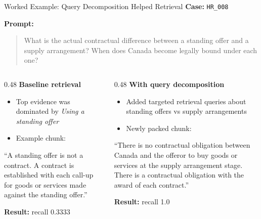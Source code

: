 \documentclass[aspectratio=169]{beamer}
\begin{document}
\appendix

\begin{frame}{Worked Example: Query Decomposition Helped Retrieval}
  \small
  \textbf{Case:} \texttt{HR\_008}

  \vspace{0.4em}
  \textbf{Prompt:}
  \begin{quote}
    What is the actual contractual difference between a standing offer and a
    supply arrangement? When does Canada become legally bound under each one?
  \end{quote}

  \begin{columns}[T]
    \begin{column}{0.48\textwidth}
      \textbf{Baseline retrieval}
      \begin{itemize}
        \item Top evidence was dominated by \emph{Using a standing offer}
        \item Example chunk:
      \end{itemize}
      \scriptsize
      ``A standing offer is not a contract. A contract is established with each
      call-up for goods or services made against the standing offer.''
      \normalsize

      \vspace{0.3em}
      \textbf{Result:} recall 0.3333
    \end{column}
    \begin{column}{0.48\textwidth}
      \textbf{With query decomposition}
      \begin{itemize}
        \item Added targeted retrieval queries about standing offers vs supply arrangements
        \item Newly packed chunk:
      \end{itemize}
      \scriptsize
      ``There is no contractual obligation between Canada and the offeror to buy
      goods or services at the supply arrangement stage. There is a contractual
      obligation with the award of each contract.''
      \normalsize

      \vspace{0.3em}
      \textbf{Result:} recall 1.0
    \end{column}
  \end{columns}
\end{frame}
\end{document}
